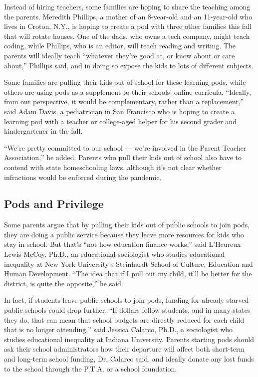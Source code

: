 Instead of hiring teachers, some families are hoping to share the
teaching among the parents. Meredith Phillips, a mother of an 8-year-old
and an 11-year-old who lives in Croton, N.Y., is hoping to create a pod
with three other families this fall that will rotate houses. One of the
dads, who owns a tech company, might teach coding, while Phillips, who
is an editor, will teach reading and writing. The parents will ideally
teach ``whatever they're good at, or know about or care about,''
Phillips said, and in doing so expose the kids to lots of different
subjects.

Some families are pulling their kids out of school for these learning
pods, while others are using pods as a supplement to their schools'
online curricula. ``Ideally, from our perspective, it would be
complementary, rather than a replacement,'' said Adam Davis, a
pediatrician in San Francisco who is hoping to create a learning pod
with a teacher or college-aged helper for his second grader and
kindergartener in the fall.

``We're pretty committed to our school --- we're involved in the Parent
Teacher Association,'' he added. Parents who pull their kids out of
school also have to contend with state homeschooling laws, although it's
not clear whether infractions would be enforced during the pandemic.

\hypertarget{pods-and-privilege}{%
\subsection{Pods and Privilege}\label{pods-and-privilege}}

Some parents argue that by pulling their kids out of public schools to
join pods, they are doing a public service because they leave more
resources for kids who stay in school. But that's ``not how education
finance works,'' said L'Heureux Lewis-McCoy, Ph.D., an educational
sociologist who studies educational inequality at New York University's
Steinhardt School of Culture, Education and Human Development. ``The
idea that if I pull out my child, it'll be better for the district, is
quite the opposite,'' he said.

In fact, if students leave public schools to join pods, funding for
already starved public schools could drop further. ``If dollars follow
students, and in many states they do, that can mean that school budgets
are directly reduced for each child that is no longer attending,'' said
Jessica Calarco, Ph.D., a sociologist who studies educational inequality
at Indiana University. Parents starting pods should ask their school
administrators how their departure will affect both short-term and
long-term school funding, Dr. Calarco said, and ideally donate any lost
funds to the school through the P.T.A. or a school foundation.

